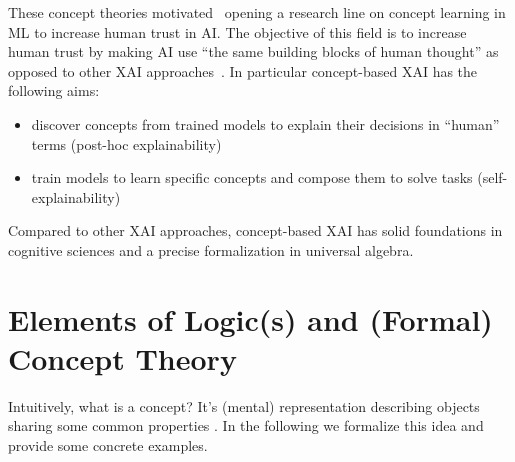 \documentclass[withindex,glossary]{cam-thesis}
\theoremstyle{plain}
\theoremstyle{definition}
\newtheorem{definition}[theorem]{Definition}
\theoremstyle{remark}
\begin{document}
These concept theories motivated~\citet{kim2018interpretability} opening a research line on concept learning in ML to increase human trust in AI. The objective of this field is to increase human trust by making AI use ``the same building blocks of human thought'' as opposed to other XAI approaches~\citep{kim2018interpretability}. In particular concept-based XAI has the following aims:
\begin{itemize}
    \item discover concepts from trained models to explain their decisions in ``human'' terms (post-hoc explainability)
    \item train models to learn specific concepts and compose them to solve tasks (self-explainability)
\end{itemize} 
Compared to other XAI approaches, concept-based XAI has solid foundations in cognitive sciences and a precise formalization in universal algebra.



\section{Elements of Logic(s) and (Formal) Concept Theory}

Intuitively, what is a concept? It's (mental) representation describing objects sharing some common properties \citep{margolis2007ontology}. In the following we formalize this idea and provide some concrete examples.
\end{document}
